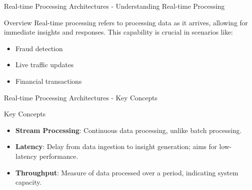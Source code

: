 \documentclass[aspectratio=169]{beamer}
\begin{document}
\begin{frame}[fragile]{Real-time Processing Architectures - Understanding Real-time Processing}
    \begin{block}{Overview}
        Real-time processing refers to processing data as it arrives, allowing for immediate insights and responses. This capability is crucial in scenarios like:
    \end{block}
    \begin{itemize}
        \item Fraud detection
        \item Live traffic updates
        \item Financial transactions
    \end{itemize}
\end{frame}

\begin{frame}[fragile]{Real-time Processing Architectures - Key Concepts}
    \begin{block}{Key Concepts}
        \begin{itemize}
            \item \textbf{Stream Processing}: Continuous data processing, unlike batch processing.
            \item \textbf{Latency}: Delay from data ingestion to insight generation; aims for low-latency performance.
            \item \textbf{Throughput}: Measure of data processed over a period, indicating system capacity.
        \end{itemize}
    \end{block}
\end{frame}
\end{document}
